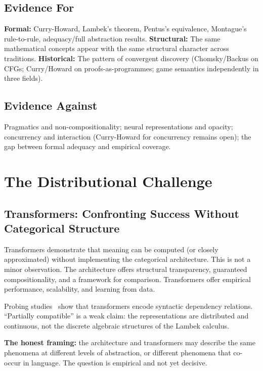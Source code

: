 \documentclass[12pt,a4paper]{article}
\begin{document}
\subsection{Evidence For}

\textbf{Formal:} Curry-Howard, Lambek's theorem, Pentus's equivalence,
Montague's rule-to-rule, adequacy/full abstraction results.
\textbf{Structural:} The same mathematical concepts appear with the same
structural character across traditions. \textbf{Historical:} The pattern of
convergent discovery (Chomsky/Backus on CFGs; Curry/Howard on
proofs-as-programmes; game semantics independently in three fields).

\subsection{Evidence Against}

Pragmatics and non-compositionality; neural representations and opacity;
concurrency and interaction (Curry-Howard for concurrency remains open);
the gap between formal adequacy and empirical coverage.

\section{The Distributional Challenge}

\subsection{Transformers: Confronting Success Without Categorical Structure}

Transformers demonstrate that meaning can be computed (or closely approximated)
without implementing the categorical architecture. This is not a minor
observation. The architecture offers structural transparency, guaranteed
compositionality, and a framework for comparison. Transformers offer empirical
performance, scalability, and learning from data.

Probing studies~\cite{HewittManning2019,Clark2019,Jawahar2019} show that
transformers encode syntactic dependency relations. ``Partially compatible'' is
a weak claim: the representations are distributed and continuous, not the
discrete algebraic structures of the Lambek calculus.

\textbf{The honest framing:} the architecture and transformers may describe the
same phenomena at different levels of abstraction, or different phenomena that
co-occur in language. The question is empirical and not yet decisive.
\end{document}

